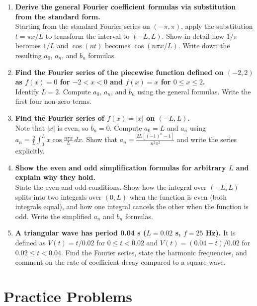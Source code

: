 \documentclass[12pt,a4paper]{article}
\begin{document}
\begin{enumerate}[leftmargin=*]

\item \textbf{Derive the general Fourier coefficient formulas via substitution from the standard form.}\\
Starting from the standard Fourier series on $(-\pi,\pi)$, apply the substitution $t = \pi x/L$ to transform the interval to $(-L,L)$.
Show in detail how $1/\pi$ becomes $1/L$ and $\cos(nt)$ becomes $\cos(n\pi x/L)$.
Write down the resulting $a_0$, $a_n$, and $b_n$ formulas.

\item \textbf{Find the Fourier series of the piecewise function defined on $(-2,2)$ as $f(x) = 0$ for $-2 < x < 0$ and $f(x) = x$ for $0 \le x \le 2$.}\\
Identify $L = 2$.
Compute $a_0$, $a_n$, and $b_n$ using the general formulas.
Write the first four non-zero terms.

\item \textbf{Find the Fourier series of $f(x) = |x|$ on $(-L,L)$.}\\
Note that $|x|$ is even, so $b_n = 0$.
Compute $a_0 = L$ and $a_n$ using $a_n = \frac{2}{L}\int_0^L x\cos\frac{n\pi x}{L}\,dx$.
Show that $a_n = \frac{2L[(-1)^n-1]}{n^2\pi^2}$ and write the series explicitly.

\item \textbf{Show the even and odd simplification formulas for arbitrary $L$ and explain why they hold.}\\
State the even and odd conditions.
Show how the integral over $(-L,L)$ splits into two integrals over $(0,L)$ when the function is even (both integrals equal), and how one integral cancels the other when the function is odd.
Write the simplified $a_n$ and $b_n$ formulas.

\item \textbf{A triangular wave has period 0.04 s ($L = 0.02$ s, $f = 25$ Hz).}
It is defined as $V(t) = t/0.02$ for $0 \le t < 0.02$ and $V(t) = (0.04-t)/0.02$ for $0.02 \le t < 0.04$.
Find the Fourier series, state the harmonic frequencies, and comment on the rate of coefficient decay compared to a square wave.

\end{enumerate}

\section{Practice Problems}
\end{document}
